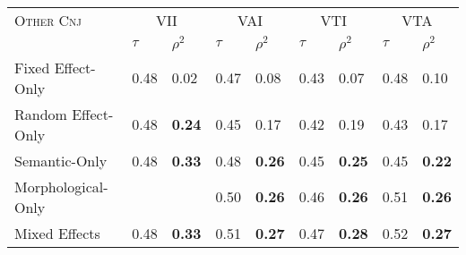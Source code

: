 \begin{table*}
\begin{minipage}[t]{\columnwidth}
\begin{tabular}{lllllllll}
            \bottomrule
            \end{tabular}
\end{minipage}
\begin{minipage}[t]{\columnwidth}
    \centering 
            \begin{tabular}{lllllllll}
                \toprule
                \textsc{Other Cnj} & \multicolumn{2}{c}{VII}                          & \multicolumn{2}{c}{VAI}                          & \multicolumn{2}{c}{VTI}          & \multicolumn{2}{c}{VTA}                         \\
                & $\tau$      &$\rho^{2}$      & $\tau$      &$\rho^{2}$ & $\tau$           &$\rho^{2}$      & $\tau$      &$\rho^{2}$ \\
                \midrule
                Fixed Effect-Only  & 0.48 & 0.02 & 0.47 & 0.08 & 0.43 & 0.07 & 0.48 & 0.10   \\    
                Random Effect-Only & 0.48 & \textbf{0.24} & 0.45 & 0.17 & 0.42 & 0.19 & 0.43 & 0.17  \\    
                Semantic-Only      & 0.48 & \textbf{0.33} & 0.48 & \textbf{0.26} & 0.45 & \textbf{0.25} & 0.45 & \textbf{0.22} \\
                Morphological-Only &   &   & 0.50 & \textbf{0.26} & 0.46 & \textbf{0.26} & 0.51 & \textbf{0.26} \\
                Mixed Effects      & 0.48 & \textbf{0.33} & 0.51 & \textbf{0.27} & 0.47 & \textbf{0.28} & 0.52 &\textbf{0.27} \\
            
                \bottomrule
                \end{tabular}
    \end{minipage}
\end{table*}


